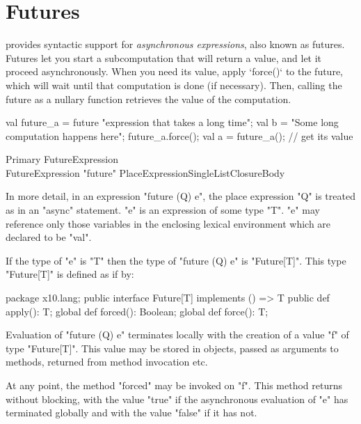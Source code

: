 \section{Futures}\label{XtenFutures}

\Xten{} provides syntactic support for {\em asynchronous expressions}, also
known as futures.  Futures let you start a subcomputation that will return a
value, and let it proceed asynchronously.  When you need its value, apply
\xcd`force()` to the future, which will wait until that computation is done
(if necessary).  Then, calling the future as a nullary function retrieves the
value of the computation.
\begin{xten}
    val future_a = future "expression that takes a long time";
    val b = "Some long computation happens here";
    future_a.force();
    val a = future_a(); // get its value
\end{xten}




\begin{grammar}
Primary \: FutureExpression \\
FutureExpression \:
  \xcd"future" PlaceExpressionSingleList\opt ClosureBody
\end{grammar} 



In more detail, in an expression \xcd"future (Q) e", the place
expression \xcd"Q" is treated as in an \xcd"async" statement. \xcd"e"
is an expression of some type \xcd"T". \xcd"e" may reference only
those variables in the enclosing lexical environment which are
declared to be \xcd"val".

If the type of \xcd"e" is \xcd"T" then the type of
\xcd"future (Q) e" is \xcd"Future[T]".  This 
type \xcd"Future[T]" is defined as if by:
\begin{xten}
package x10.lang;
public interface Future[T] implements () => T {
  public def apply(): T;
  global def forced(): Boolean;
  global def force(): T;
}
\end{xten}

Evaluation of \xcd"future (Q) e" terminates locally with the creation
of a value \xcd"f" of type \xcd"Future[T]".  This value may be
stored in objects, passed as arguments to methods, returned from
method invocation etc. 

At any point, the method \xcd"forced" may be invoked on \xcd"f". This
method returns without blocking, with the value \xcd"true" if the
asynchronous evaluation of \xcd"e" has terminated globally and with
the value \xcd"false" if it has not.


